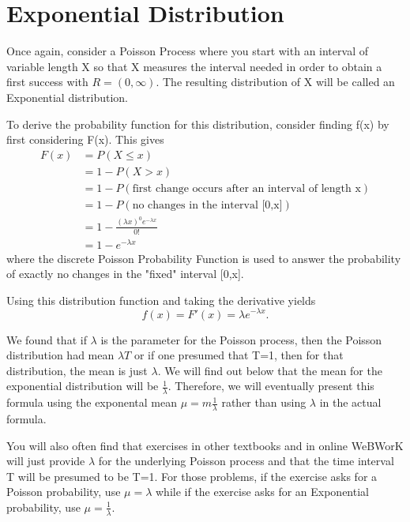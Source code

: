 \documentclass[10pt,]{book}
\numberwithin{equation}{section}
\newcommand{\gt}{>}
\begin{document}
\section[{Exponential Distribution}]{Exponential Distribution}\label{section-53}
\hypertarget{p-1076}{}%
Once again, consider a Poisson Process where you start with an interval of variable length X so that X measures the interval needed in order to obtain a first success with \(R = (0,\infty)\). The resulting distribution of X will be called an Exponential distribution.%
\par
\hypertarget{p-1077}{}%
To derive the probability function for this distribution, consider finding f(x) by first considering F(x). This gives%
\begin{align*}
F(x)&  = P(X \le x)\\
& = 1 - P(X \gt x)\\
& = 1 - P(\text{first change occurs after an interval of length x})\\
& = 1 - P(\text{no changes in the interval [0,x]})\\
& = 1 - \frac{(\lambda x)^0 e^{-\lambda x}}{0!}\\
& = 1 - e^{-\lambda x}
\end{align*}
where the discrete Poisson Probability Function is used to answer the probability of exactly no changes in the "fixed" interval [0,x].%
\par
\hypertarget{p-1078}{}%
Using this distribution function and taking the derivative yields%
\begin{equation*}
f(x) = F'(x) = \lambda e^{-\lambda x}.
\end{equation*}
%
\par
\hypertarget{p-1079}{}%
We found that if \(\lambda\) is the parameter for the Poisson process, then the Poisson distribution had mean \(\lambda T\) or if one presumed that T=1, then for that distribution, the mean is just \(\lambda\).  We will find out below that the mean for the exponential distribution will be \(\frac{1}{\lambda}\). Therefore, we will eventually present this formula using the exponental mean \(\mu =m \frac{1}{\lambda}\) rather than using \(\lambda\) in the actual formula.%
\par
\hypertarget{p-1080}{}%
You will also often find that exercises in other textbooks and in online WeBWorK will just provide \(\lambda\) for the underlying Poisson process and that the time interval T will be presumed to be T=1.  For those problems, if the exercise asks for a Poisson probability, use \(\mu = \lambda\) while if the exercise asks for an Exponential probability, use \(\mu = \frac{1}{\lambda}\).%
\end{document}
